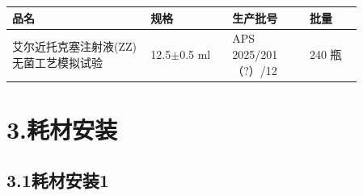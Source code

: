 \documentclass[UTF8,10pt,a4paper,fontset=fandol]{ctexart}
\newcommand{\fieldvalue}[1]{#1}
\newcommand{\handwritten}[1]{#1}
\begin{document}
\begin{center}
\small
\begin{tabular}{|p{0.34\linewidth}|p{0.20\linewidth}|p{0.19\linewidth}|p{0.13\linewidth}|}
\hline
品名 & 规格 & 生产批号 & 批量 \\ \hline
\fieldvalue{艾尔近托克塞注射液(ZZ)无菌工艺模拟试验}
&
\fieldvalue{12.5$\pm$0.5 ml}
&
\fieldvalue{\handwritten{APS 2025/201（?）/12}}
&
\fieldvalue{\handwritten{240}} 瓶
\\ \hline
\end{tabular}
\end{center}

\section*{3.\quad 耗材安装}

\subsection*{3.1\quad 耗材安装1}
\end{document}
